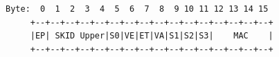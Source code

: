\documentclass[fleqn,10pt,lineno]{wlpeerj}
\begin{document}
\begin{verbatim}
Byte:  0  1  2  3  4  5  6  7  8  9 10 11 12 13 14 15
     +--+--+--+--+--+--+--+--+--+--+--+--+--+--+--+--+
     |EP| SKID Upper|S0|VE|ET|VA|S1|S2|S3|    MAC    |
     +--+--+--+--+--+--+--+--+--+--+--+--+--+--+--+--+
\end{verbatim}
\end{document}
